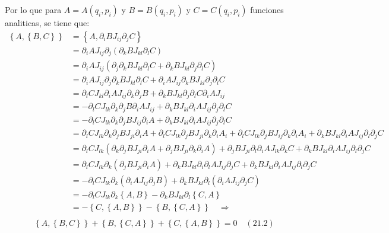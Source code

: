\documentclass[a4paper]{article}
\begin{document}
\begin{answer}[punto 21]
        Por lo que para $A=A(q_i, p_i)$ y $B=B(q_i, p_i)$ y $C=C(q_i, p_i)$  funciones analiticas, se tiene que:
        \begin{align*}
            \left\{A, \left\{B,C \right\} \right\} &= \left\{A, \partial_i B J_{ij} \partial_j C \right\}\\
            &= \partial_i A J_{ij} \partial_j \left(\partial_k B J_{kl} \partial_l C \right)\\
            &= \partial_i A J_{ij} \left(\partial_j \partial_k B J_{kl} \partial_l C + \partial_k B J_{kl} \partial_j \partial_l C \right)\\
            &=  \partial_i A J_{ij}\partial_j \partial_k B J_{kl} \partial_l C + \partial_i A J_{ij}\partial_k B J_{kl} \partial_j \partial_l C \\
            &= \partial_l C  J_{kl} \partial_i A J_{ij}\partial_k \partial_j B + \partial_k B J_{kl}\partial_j \partial_l C \partial_i A J_{ij} \\
            &= -\partial_l C  J_{lk} \partial_k \partial_j B \partial_i A J_{ij} + \partial_k B J_{kl} \partial_i A J_{ij} \partial_j \partial_l C   \\
            &= -\partial_l C  J_{lk}\partial_k \partial_j B J_{ij}\partial_i A + \partial_k B J_{kl} \partial_i A J_{ij} \partial_j \partial_l C  \\
            &= \partial_l C  J_{lk} \partial_k \partial_j BJ_{ji}\partial_i A + \partial_l C  J_{lk} \partial_j BJ_{ji}\partial_k  \partial_i A_i + \partial_l C  J_{lk} \partial_j BJ_{ij}\partial_k  \partial_i A_i + \partial_k B J_{kl} \partial_i A J_{ij} \partial_l \partial_j C \\
            &= \partial_l C  J_{lk}\left(\partial_k \partial_j BJ_{ji}\partial_i A + \partial_j BJ_{ji}\partial_k  \partial_i A\right) + \partial_j B J_{ji}\partial_l\partial_i A  J_{lk}   \partial_k C   + \partial_k B J_{kl} \partial_i A J_{ij} \partial_l \partial_j C\\
            &= \partial_l C  J_{lk}\partial_k\left(\partial_j BJ_{ji} \partial_i A\right) + \partial_k B J_{kl}\partial_i\partial_l A  J_{ij}   \partial_j C   + \partial_k B J_{kl} \partial_i A J_{ij} \partial_l \partial_j C\\
            &= -\partial_l C  J_{lk}\partial_k\left(\partial_i A J_{ij} \partial_j B\right) + \partial_k B J_{kl}\partial_l(\partial_i A  J_{ij}   \partial_j C)  \\
            &= -\partial_l C  J_{lk}\partial_k\left\{A,B\right\} - \partial_k B J_{kl}\partial_l\left\{C,A\right\}  \\
            &= -\left\{C,\left\{A,B\right\}\right\} - \left\{B,\left\{C,A\right\}\right\}  \quad \Rightarrow  \\
        \end{align*}
        \begin{align*}
            \left\{A, \left\{B,C \right\} \right\} + \left\{B, \left\{C,A \right\} \right\} + \left\{C, \left\{A,B \right\} \right\} = 0 \quad (21.2)
        \end{align*}




\end{answer}
\end{document}
